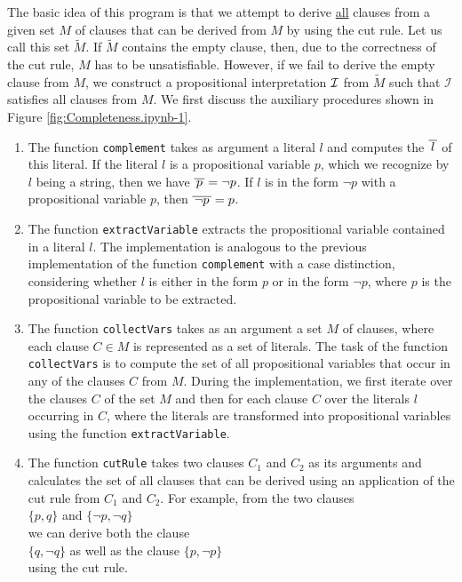 The basic idea
of this program is that we attempt to derive \underline{all} clauses from a given set $M$ of clauses
that can be derived from $M$ by using the cut rule.  Let us call this set $\widetilde{M}$.  If $\widetilde{M}$ contains the empty clause,
then, due to the correctness of the cut rule, $M$ has to be unsatisfiable. However, if we fail to derive the empty clause from $M$,
we construct a propositional interpretation
$\mathcal{I}$ from $\widetilde{M}$ such that $\mathcal{I}$ satisfies all clauses from $M$.
We first discuss the auxiliary procedures shown in Figure \ref{fig:Completeness.ipynb-1}.
\begin{enumerate}
\item The function \texttt{complement} takes as argument a literal $l$ and computes the
       $\overline{\,l\,}$ of this literal.
      If the literal $l$ is a propositional variable $p$, which we recognize by $l$ being a string,
      then we have $\overline{\,p\,} = \neg p$.
      If $l$ is in the form $\neg p$ with a propositional variable $p$, then $\overline{\,\neg p\,} =
      p$.
\item The function \texttt{extractVariable} extracts the propositional variable contained in a literal $l$.
      The implementation is analogous to the previous implementation of the function 
      \texttt{complement} with a case distinction, considering whether $l$ is either in the form
      $p$ or in the form $\neg p$, where $p$ is the propositional variable to be extracted.
\item The function \texttt{collectVars} takes as an argument a set $M$ of clauses, where each
      clause \mbox{$C \!\in\! M$} is represented as a set of literals. The task of the
      function \texttt{collectVars} is to compute the set of all propositional variables
      that occur in any of the clauses $C$ from $M$. During the implementation, we first iterate
      over the clauses $C$ of the set $M$ and then for each clause $C$ over the literals $l$ occurring in $C$,
      where the literals are transformed into propositional variables using the function \texttt{extractVariable}.
\item The function \texttt{cutRule} takes two clauses $C_1$ and $C_2$ as its arguments and calculates
      the set of all clauses that can be derived using an application of the cut rule from $C_1$ and $C_2$.
      For example, from the two clauses
      \\[0.2cm]
      \hspace*{1.3cm}
      $\{ p, q \}$ \quad and \quad $\{ \neg p, \neg q \}$ 
      \\[0.2cm]
      we can derive both the clause
      \\[0.2cm]
      \hspace*{1.3cm}
      $\{q, \neg q\}$ \quad as well as the clause \quad $\{p, \neg p \}$
      \\[0.2cm]
      using the cut rule.
\end{enumerate}

